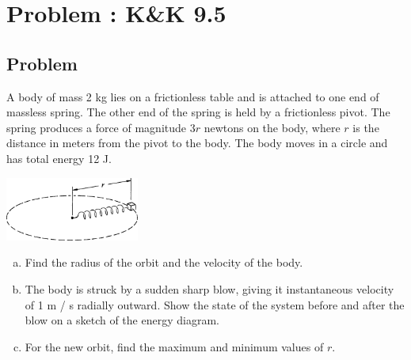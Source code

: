 \documentclass[solutions]{esg8012pset}
\begin{document}
\section{Problem \thesection: K\&K 9.5}
\subsection{Problem}
  A body of mass 2 kg lies on a frictionless table and is attached to one end of massless spring. The other end of the spring is held by a frictionless pivot. The spring produces a force of magnitude $3r$  newtons on the body, where $r$ is the distance in meters from the pivot to the body. The body moves in a circle and has total energy 12 J.
  \begin{center}\includegraphics[width=0.33\textwidth]{ps10_1}\end{center}
  \begin{enumerate}[(a)]
    \item Find the radius of the orbit and the velocity of the body.
    \item The body is struck by a sudden sharp blow, giving it instantaneous velocity of 1 m / s radially outward. Show the state of the system before and after the blow on a sketch of the energy diagram.
    \item For the new orbit, find the maximum and minimum values of $r$.
  \end{enumerate}
\end{document}
